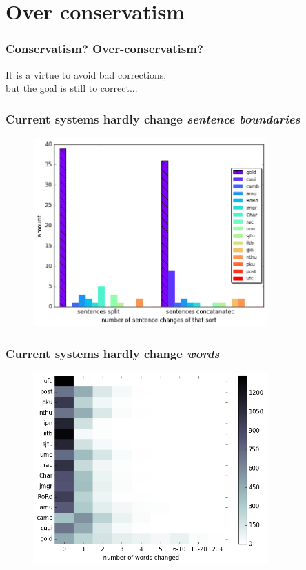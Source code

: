 \documentclass{beamer}
\begin{document}
\section{Over conservatism}
\begin{frame}
	\frametitle{Conservatism? Over-conservatism?}
	It is a virtue to avoid bad corrections, \\but the goal is still to correct...
	
\end{frame}
\begin{frame}
	\frametitle{Current systems hardly change \emph{sentence boundaries}}
	\begin{figure}
		\includegraphics[width = 0.8\textwidth]{aligned}
	\end{figure}
\end{frame}
\begin{frame}
	\frametitle{Current systems hardly change \emph{words}}
	\begin{figure}
		\includegraphics[width = 0.8\textwidth]{words_differences_heat}
	\end{figure}
\end{frame}
\end{document}

